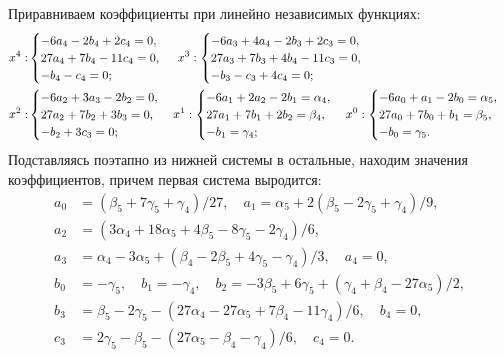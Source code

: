 \documentclass[11pt]{article}
\begin{document}
{Приравниваем коэффициенты при линейно независимых функциях:
\[
\begin{aligned}
x^4: & \begin{cases}
-6a_4 - 2b_4 + 2c_4 = 0, \\
27a_4 + 7b_4 - 11c_4 = 0, \\
-b_4 - c_4 = 0;
\end{cases} \hspace{0.25em}
x^3: \begin{cases}
-6a_3 + 4a_4 - 2b_3 + 2c_3 = 0, \\
27a_3 + 7b_3 + 4b_4 - 11c_3 = 0, \\
-b_3 - c_3 + 4c_4 = 0;
\end{cases} \\
x^2: & \begin{cases}
-6a_2 + 3a_3 - 2b_2 = 0, \\
27a_2 + 7b_2 + 3b_3 = 0, \\
-b_2 + 3c_3 = 0;
\end{cases}
x^1: \begin{cases}
-6a_1 + 2a_2 - 2b_1 = \alpha_4, \\
27a_1 + 7b_1 + 2b_2 = \beta_4, \\
-b_1 = \gamma_4;
\end{cases}
x^0: \begin{cases}
-6a_0 + a_1 - 2b_0 = \alpha_5, \\
27a_0 + 7b_0 + b_1 = \beta_5, \\
-b_0 = \gamma_5.
\end{cases}
\end{aligned}
\]
Подставляясь поэтапно из нижней системы в остальные, находим значения коэффициентов, причем первая система выродится:
\begin{align*}
a_0 &= (\beta_5 + 7\gamma_5 + \gamma_4)/27, \quad a_1 = \alpha_5 + 2(\beta_5 - 2\gamma_5 + \gamma_4)/9, \\a_2 &= (3\alpha_4 + 18\alpha_5 + 4\beta_5 - 8\gamma_5 - 2\gamma_4)/6, \\
a_3 &= \alpha_4 - 3\alpha_5 + (\beta_4 - 2\beta_5 + 4\gamma_5 - \gamma_4)/3, \quad a_4 = 0, \\[3pt]
b_0 &= -\gamma_5, \quad b_1 = -\gamma_4, \quad b_2 = - 3\beta_5 + 6\gamma_5 + (\gamma_4 + \beta_4 - 27\alpha_5)/2,\\
b_3 &= \beta_5 - 2\gamma_5 -(27\alpha_4 - 27\alpha_5 + 7\beta_4 - 11\gamma_4)/6, \quad b_4 = 0, \\[3pt]
c_3 &= 2\gamma_5 - \beta_5 -(27\alpha_5 - \beta_4 - \gamma_4)/6, \quad c_4 = 0.
\end{align*}

}
\end{document}
